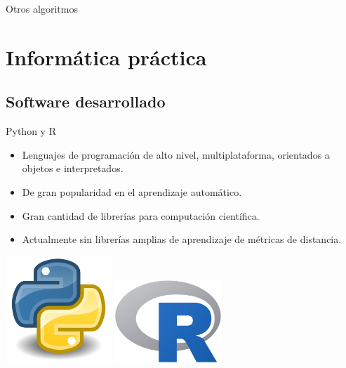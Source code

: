 \documentclass[10pt, compress]{beamer}
\begin{document}
\begin{frame}{Otros algoritmos}
\begin{minipage}[t][\textheight][t]{0.42\textwidth}
{\begin{minipage}[t][\textheight][t]{1.66\textwidth}

  \end{minipage}
  }

  \end{minipage}
\end{frame}

\section{Informática práctica}

\subsection{Software desarrollado}

\begin{frame}{Python y R}
  \begin{itemize}
    \item Lenguajes de programación de alto nivel, multiplataforma, orientados a objetos e interpretados.
    \item De gran popularidad en el aprendizaje automático.
    \item Gran cantidad de librerías para computación científica.
    \item Actualmente sin librerías amplias de aprendizaje de métricas de distancia.
  \end{itemize}
  \begin{center}
    \includegraphics[width=0.3\textwidth]{images/Python.png}
    \hspace{0.2\textwidth}
    \includegraphics[width=0.3\textwidth]{images/R_logo.png}
  \end{center}
\end{frame}
\end{document}
